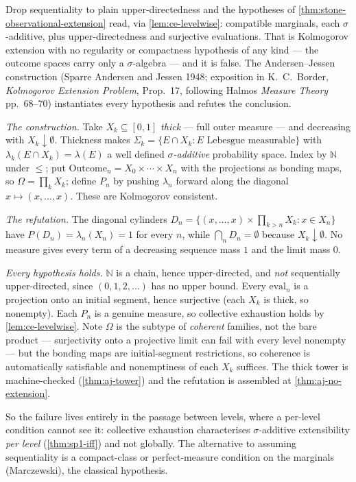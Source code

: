 Drop sequentiality to plain upper-directedness and the hypotheses of
\ref{thm:stone-observational-extension} read, via \ref{lem:ce-levelwise}:
compatible marginals, each $\sigma$-additive, plus upper-directedness and
surjective evaluations. That is Kolmogorov extension with no regularity or
compactness hypothesis of any kind --- the outcome spaces carry only a
$\sigma$-algebra --- and it is false. The Andersen--Jessen construction
(Sparre Andersen and Jessen 1948; exposition in K.~C.~Border,
\emph{Kolmogorov Extension Problem}, Prop.~17, following Halmos
\emph{Measure Theory} pp.~68--70) instantiates every hypothesis and refutes
the conclusion.

\emph{The construction.} Take $X_k \subseteq [0,1]$ \emph{thick} --- full
outer measure --- and decreasing with $X_k \downarrow \emptyset$. Thickness
makes $\Sigma_k = \{E \cap X_k : E \text{ Lebesgue measurable}\}$ with
$\lambda_k(E \cap X_k) = \lambda(E)$ a well defined \emph{$\sigma$-additive}
probability space. Index by $\mathbb{N}$ under $\leq$; put
$\mathrm{Outcome}_n = X_0 \times \cdots \times X_n$ with the projections as
bonding maps, so $\Omega = \prod_k X_k$; define $P_n$ by pushing $\lambda_n$
forward along the diagonal $x \mapsto (x,\dots,x)$. These are Kolmogorov
consistent.

\emph{The refutation.} The diagonal cylinders
$D_n = \{(x,\dots,x) \times \prod_{k>n} X_k : x \in X_n\}$ have
$P(D_n) = \lambda_n(X_n) = 1$ for every $n$, while $\bigcap_n D_n = \emptyset$
because $X_k \downarrow \emptyset$. No measure gives every term of a
decreasing sequence mass $1$ and the limit mass $0$.

\emph{Every hypothesis holds.} $\mathbb{N}$ is a chain, hence upper-directed,
and \emph{not} sequentially upper-directed, since $(0,1,2,\dots)$ has no upper
bound. Every $\mathrm{eval}_n$ is a projection onto an initial segment, hence
surjective (each $X_k$ is thick, so nonempty). Each $P_n$ is a genuine measure,
so collective exhaustion holds by \ref{lem:ce-levelwise}. Note $\Omega$ is the
subtype of \emph{coherent} families, not the bare product --- surjectivity onto
a projective limit can fail with every level nonempty --- but the bonding maps
are initial-segment restrictions, so coherence is automatically satisfiable and
nonemptiness of each $X_k$ suffices. The thick tower is machine-checked
(\ref{thm:aj-tower}) and the refutation is assembled at
\ref{thm:aj-no-extension}.

So the failure lives entirely in the passage between levels, where a per-level
condition cannot see it: collective exhaustion characterises $\sigma$-additive
extensibility \emph{per level} (\ref{thm:sp1-iff}) and not globally. The
alternative to assuming sequentiality is a compact-class or perfect-measure
condition on the marginals (Marczewski), the classical hypothesis.


